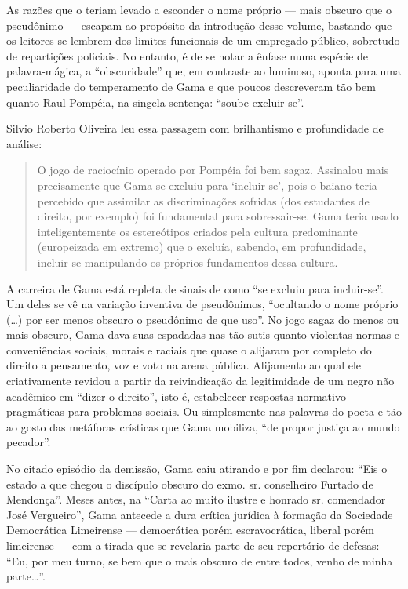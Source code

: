 As razões que o teriam levado a esconder o nome próprio --- mais obscuro
que o pseudônimo --- escapam ao propósito da introdução desse volume,
bastando que os leitores se lembrem dos limites funcionais de um
empregado público, sobretudo de repartições policiais. No entanto, é de
se notar a ênfase numa espécie de palavra-mágica, a ``obscuridade'' que,
em contraste ao luminoso, aponta para uma peculiaridade do temperamento
de Gama e que poucos descreveram tão bem quanto Raul Pompéia, na singela
sentença: ``soube excluir-se''.

Silvio Roberto Oliveira leu essa passagem com brilhantismo e
profundidade de análise:

\begin{quote}
O jogo de raciocínio operado por Pompéia foi bem sagaz. Assinalou mais
precisamente que Gama se excluiu para `incluir-se', pois o baiano teria
percebido que assimilar as discriminações sofridas (dos estudantes de
direito, por exemplo) foi fundamental para sobressair-se. Gama teria
usado inteligentemente os estereótipos criados pela cultura predominante
(europeizada em extremo) que o excluía, sabendo, em profundidade,
incluir-se manipulando os próprios fundamentos dessa cultura.
\end{quote}

A carreira de Gama está repleta de sinais de como ``se excluiu para
incluir-se''. Um deles se vê na variação inventiva de pseudônimos,
``ocultando o nome próprio (\ldots{}) por ser menos obscuro o pseudônimo de
que uso''. No jogo sagaz do menos ou mais obscuro, Gama dava suas
espadadas nas tão sutis quanto violentas normas e conveniências sociais,
morais e raciais que quase o alijaram por completo do direito a
pensamento, voz e voto na arena pública. Alijamento ao qual ele
criativamente revidou a partir da reivindicação da legitimidade de um
negro não acadêmico em ``dizer o direito'', isto é, estabelecer respostas
normativo-pragmáticas para problemas sociais. Ou simplesmente nas
palavras do poeta e tão ao gosto das metáforas crísticas que Gama
mobiliza, ``de propor justiça ao mundo pecador''.

No citado episódio da demissão, Gama caiu atirando e por fim declarou:
``Eis o estado a que chegou o discípulo obscuro do exmo. sr. conselheiro
Furtado de Mendonça''. Meses antes, na ``Carta ao muito ilustre e
honrado sr. comendador José Vergueiro'', Gama antecede a dura crítica
jurídica à formação da Sociedade Democrática Limeirense --- democrática
porém escravocrática, liberal porém limeirense --- com a tirada que se
revelaria parte de seu repertório de defesas: ``Eu, por meu turno, se bem
que o mais obscuro de entre todos, venho de minha parte\ldots{}''.

